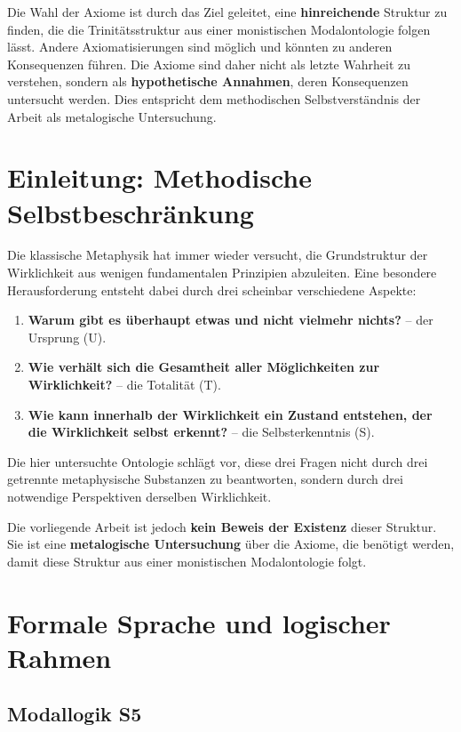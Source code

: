 \documentclass[
]{article}
\begin{document}
Die Wahl der Axiome ist durch das Ziel geleitet, eine \textbf{hinreichende} Struktur zu finden, die die Trinitätsstruktur aus einer monistischen Modalontologie folgen lässt. Andere Axiomatisierungen sind möglich und könnten zu anderen Konsequenzen führen. Die Axiome sind daher nicht als letzte Wahrheit zu verstehen, sondern als \textbf{hypothetische Annahmen}, deren Konsequenzen untersucht werden. Dies entspricht dem methodischen Selbstverständnis der Arbeit als metalogische Untersuchung.

\section{Einleitung: Methodische Selbstbeschränkung}

Die klassische Metaphysik hat immer wieder versucht, die Grundstruktur der Wirklichkeit aus wenigen fundamentalen Prinzipien abzuleiten. Eine besondere Herausforderung entsteht dabei durch drei scheinbar verschiedene Aspekte:

\begin{enumerate}
\item \textbf{Warum gibt es überhaupt etwas und nicht vielmehr nichts?} – der Ursprung (U).
\item \textbf{Wie verhält sich die Gesamtheit aller Möglichkeiten zur Wirklichkeit?} – die Totalität (T).
\item \textbf{Wie kann innerhalb der Wirklichkeit ein Zustand entstehen, der die Wirklichkeit selbst erkennt?} – die Selbsterkenntnis (S).
\end{enumerate}

Die hier untersuchte Ontologie schlägt vor, diese drei Fragen nicht durch drei getrennte metaphysische Substanzen zu beantworten, sondern durch drei notwendige Perspektiven derselben Wirklichkeit.

Die vorliegende Arbeit ist jedoch \textbf{kein Beweis der Existenz} dieser Struktur. Sie ist eine \textbf{metalogische Untersuchung} über die Axiome, die benötigt werden, damit diese Struktur aus einer monistischen Modalontologie folgt.

\section{Formale Sprache und logischer Rahmen}

\subsection{Modallogik S5}
\end{document}
